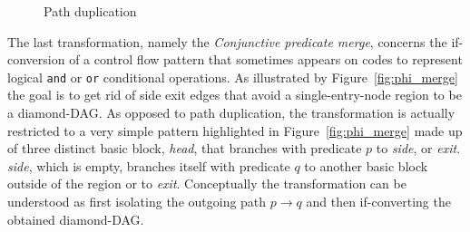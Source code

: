 \begin{figure}[h]
  \caption{\label{fig:phi_aug}Path duplication}
\end{figure}


The last transformation, namely the \emph{Conjunctive predicate merge}, concerns the if-conversion of a control flow pattern that sometimes appears on codes to represent logical \texttt{and} or \texttt{or} conditional operations. As illustrated by Figure~\ref{fig:phi_merge} the goal is to get rid of side exit edges that avoid a single-entry-node region to be a diamond-DAG. As opposed to path duplication, the transformation is actually restricted to a very simple pattern highlighted in Figure~\ref{fig:phi_merge} made up of three distinct basic block, \textit{head}, that branches with predicate $p$ to \textit{side}, or \textit{exit}. \textit{side}, which is empty, branches itself with predicate $q$ to another basic block outside of the region or to \textit{exit}. Conceptually the transformation can be understood as first isolating the outgoing path $p\rightarrow q$ and then if-converting the obtained diamond-DAG. 

